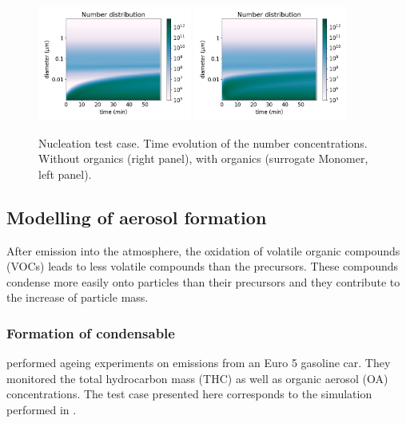 \documentclass[a4paper,11pt]{article}
\begin{document}
       

\begin{figure}[H]
        \begin{center}
                \includegraphics[angle=0,width=0.45\textwidth]{../graph/figure_ref/fig_banana.png}
                \includegraphics[angle=0,width=0.45\textwidth]{../graph/figure_ref/fig_banana_org.png}
        \end{center}
\caption{Nucleation test case. Time evolution of the number concentrations. Without organics (right panel), with organics (surrogate Monomer, left panel).}
\label{fig-nucl2}
\end{figure}
       

\subsection{Modelling of aerosol formation}

After emission into the atmosphere, the oxidation of volatile organic compounds (VOCs) leads to less volatile compounds than the precursors. 
These compounds condense more easily onto particles than their precursors and they contribute to the increase of particle mass.

\subsubsection{Formation of condensable}

\cite{platt2013secondary} performed ageing experiments on emissions from an Euro 5 gasoline car. They monitored the total hydrocarbon mass (THC) as well as organic aerosol (OA) concentrations. 
The test case presented here corresponds to the simulation performed in \cite{sartelet2018}.
\end{document}
